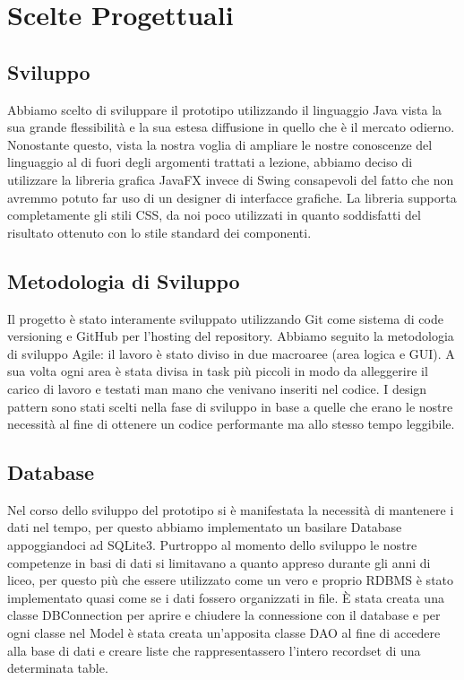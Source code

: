 \documentclass[a4paper, 11pt]{article}
\begin{document}
	\section{Scelte Progettuali}
		\subsection{Sviluppo}
		Abbiamo scelto di sviluppare il prototipo utilizzando il linguaggio Java vista la sua grande flessibilità e la sua estesa diffusione in quello che è il mercato odierno. Nonostante questo, vista la nostra voglia di ampliare le nostre conoscenze del linguaggio al di fuori degli argomenti trattati a lezione, abbiamo deciso di utilizzare la libreria grafica JavaFX invece di Swing consapevoli del fatto che non avremmo potuto far uso di un designer di interfacce grafiche.\newline
		La libreria supporta completamente gli stili CSS, da noi poco utilizzati in quanto soddisfatti del risultato ottenuto con lo stile standard dei componenti.
		
		\subsection{Metodologia di Sviluppo}
		Il progetto è stato interamente sviluppato utilizzando Git come sistema di code versioning e GitHub per l'hosting del repository. Abbiamo seguito la metodologia di sviluppo Agile: il lavoro è stato diviso in due macroaree (area logica e GUI).\newline 
		A sua volta ogni area è stata divisa in task più piccoli in modo da alleggerire il carico di lavoro e testati man mano che venivano inseriti nel codice. I design pattern sono stati scelti nella fase di sviluppo in base a quelle che erano le nostre necessità al fine di ottenere un codice performante ma allo stesso tempo leggibile.
		
		\subsection{Database}
		Nel corso dello sviluppo del prototipo si è manifestata la necessità di mantenere i dati nel tempo, per questo abbiamo implementato un basilare Database appoggiandoci ad SQLite3. Purtroppo al momento dello sviluppo le nostre competenze in basi di dati si limitavano a quanto appreso durante gli anni di liceo, per questo più che essere utilizzato come un vero e proprio RDBMS  è stato implementato quasi come se i dati fossero organizzati in file.\newline
		È stata creata una classe DBConnection per aprire e chiudere la connessione con il database e per ogni classe nel Model è stata creata un'apposita classe DAO al fine di accedere alla base di dati e creare liste che rappresentassero l'intero recordset di una determinata table.
		 
\end{document}
